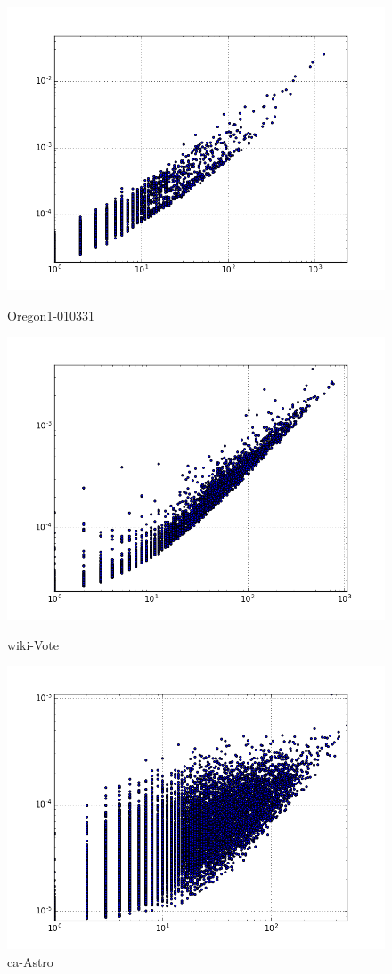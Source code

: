 \begin{figure}[H]
  \includegraphics[width=\linewidth]{img/oregon-010331/degreeVSpagerank.png}
  \caption*{Oregon1-010331}
\endminipage\hfill
{}
  \includegraphics[width=\linewidth]{img/wiki-Vote/degreeVSpagerank.png}
  \caption*{wiki-Vote}
\endminipage\hfill
{}
  \includegraphics[width=\linewidth]{img/ca-Astro/degreeVSpagerank.png}
  \caption*{ca-Astro}
\endminipage
\end{figure}
